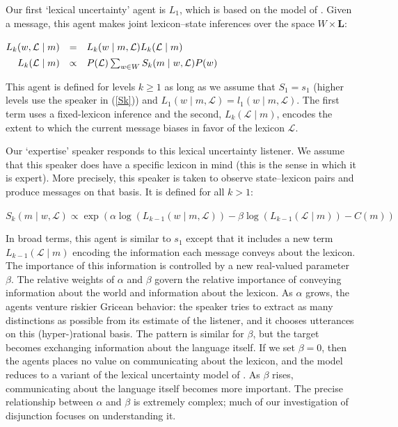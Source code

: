 \documentclass[12pt,twoside]{article}
\newcommand{\eg}[1]{(\ref{#1})}
\DeclareMathOperator{\exponential}{exp}
\newcommand{\given}{\mid}
\newcommand{\States}{W}
\newcommand{\state}{w}
\newcommand{\Lex}{\mathcal{L}}
\newcommand{\LexSet}{\mathbf{L}}
\newcommand{\msg}{m}
\newcommand{\Costs}{C}
\newcommand{\Prior}{P}
\newcommand{\speakerOne}{s_{1}}
\newcommand{\listenerOne}{l_{1}}
\newcommand{\SpeakerK}[1][k]{S_{#1}}
\newcommand{\ListenerK}[1][k]{L_{#1}}
\renewcommand{\_}{\textbf{\textunderscore\hspace{-4pt}\textunderscore\hspace{-3pt}\textunderscore\hspace{-4pt}\textunderscore}\hspace{0.5pt}}			%
\begin{document}
Our first `lexical uncertainty' agent is $\ListenerK[1]$, which is
based on the model of \citet{Smith:Goodman:Frank:2013}. Given a
message, this agent makes joint lexicon--state inferences over the
space $\States \times \LexSet$:
%
\begin{exe}
  \ex\label{L1}%
    \setlength{\arraycolsep}{2pt}%
    $\begin{array}[t]{@{} r c l}
      \ListenerK(\state, \Lex \given \msg) 
      &=&
      \ListenerK(\state \given \msg, \Lex) \ListenerK(\Lex \given \msg) 
      \\[1ex]
      \ListenerK(\Lex \given \msg) 
      &\propto& 
      \Prior(\Lex) \sum_{\state\in\States} \SpeakerK(\msg \given \state, \Lex)\Prior(\state)
    \end{array}$
\end{exe}
%
This agent is defined for levels $k \geqslant 1$ as long as we assume
that $\SpeakerK[1] = \speakerOne$ (higher levels use the speaker in
\eg{Sk}) and
$\ListenerK[1](\state \given \msg, \Lex) = \listenerOne(\state \given \msg, \Lex)$.
The first term uses a fixed-lexicon inference and the second,
$\ListenerK(\Lex \given \msg)$, encodes the extent to which the
current message biases in favor of the lexicon $\Lex$.

Our `expertise' speaker responds to this lexical uncertainty listener.
We assume that this speaker does have a specific lexicon in mind (this
is the sense in which it is expert).  More precisely, this speaker is
taken to observe state--lexicon pairs and produce messages on that
basis. It is defined for all $k > 1$:

\begin{exe}  
  \ex\label{Sk}%
   $\SpeakerK(\msg \given \state, \Lex) \propto \exponential \left( \alpha\log\left(\ListenerK[k-1](\state \given \msg, \Lex)\right)  -  \beta\log\left(\ListenerK[k-1](\Lex\given\msg)\right) - \Costs(\msg) \right)$
\end{exe}
%
In broad terms, this agent is similar to $\speakerOne$ except that it
includes a new term $\ListenerK[k-1](\Lex\given\msg)$ encoding the
information each message conveys about the lexicon. The 
importance of this information is controlled by a new real-valued
parameter $\beta$. The relative weights of $\alpha$ and $\beta$
govern the relative importance of conveying information about the
world and information about the lexicon. As $\alpha$ grows, the agents
venture riskier Gricean behavior: the speaker tries to extract as many
distinctions as possible from its estimate of the listener, and it
chooses utterances on this (hyper-)rational basis. The pattern is
similar for $\beta$, but the target becomes exchanging information
about the language itself. If we set $\beta=0$, then the agents places
no value on communicating about the lexicon, and the model reduces to
a variant of the lexical uncertainty model of
\citet{bergen-levy-goodman:2014}. As $\beta$ rises, communicating
about the language itself becomes more important. The precise
relationship between $\alpha$ and $\beta$ is extremely complex; much
of our investigation of disjunction focuses on understanding it.
\end{document}

